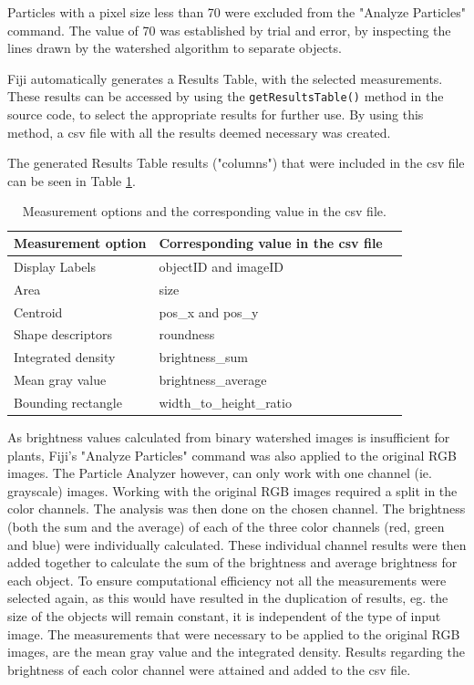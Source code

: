 \documentclass[paper=A4,bibliography=totocnumbered]{scrartcl}
\begin{document}
Particles with a pixel size less than 70 were excluded from the "Analyze Particles" command. The value of 70 was established by trial and error, by inspecting the lines drawn by the watershed algorithm to separate objects.

Fiji automatically generates a Results Table, with the selected measurements. These results can be accessed by using the \texttt{getResultsTable()} method in the source code, to select the appropriate results for further use. By using this method, a csv file with all the results deemed necessary was created. 

The generated Results Table results ("columns") that were included in the csv file can be seen in Table \ref{tab:result_table}.

\begin{table}[htbp]
	\centering
	\caption{Measurement options and the corresponding value in the csv file.}
	\begin{tabular}{lll}
		\toprule
		Measurement option  & Corresponding value in the csv file \\
		\midrule
		 Display Labels & objectID and imageID\\
		Area & size\\
		Centroid & pos\_x and pos\_y\\
		Shape descriptors & roundness\\
        Integrated density & brightness\_sum\\
      	Mean gray value & brightness\_average\\
       	Bounding rectangle & width\_to\_height\_ratio\\
        \bottomrule
	\end{tabular}
	\label{tab:result_table}
\end{table}

As brightness values calculated from binary watershed images is insufficient for plants, Fiji's "Analyze Particles" command was also applied to the original RGB images. The Particle Analyzer however, can only work with one channel (ie. grayscale) images. Working with the original RGB images required a split in the color channels. The analysis was then done on the chosen channel. The brightness (both the sum and the average) of each of the three color channels (red, green and blue) were individually calculated. These individual channel results were then added together to calculate the sum of the brightness and average brightness for each object. To ensure computational efficiency not all the measurements were selected again, as this would have resulted in the duplication of results, eg. the size of the objects will remain constant, it is independent of the type of input image. The measurements that were necessary to be applied to the original RGB images, are the mean gray value and the integrated density. Results regarding the brightness of each color channel were attained and added to the csv file. 
\end{document}
